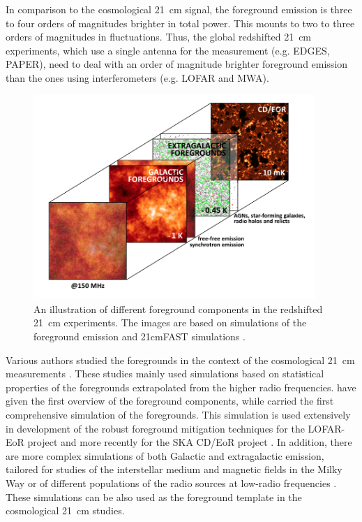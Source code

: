 In comparison to the cosmological 21~cm signal, the foreground emission is three to four orders of magnitudes brighter in total power. This mounts to two to three orders of magnitudes in fluctuations. Thus, the global redshifted 21~cm experiments, which use a single antenna for the measurement (e.g. EDGES, PAPER), need to deal with an order of magnitude brighter foreground emission than the ones using interferometers (e.g. LOFAR and MWA). 

\begin{figure}[!t]
   \centering
    \includegraphics[width=0.95\textwidth]{Chapman_Jelic/Images/fgcube.png}
    \caption{An illustration of different foreground components in the redshifted 21~cm experiments. The images are based on \cite{jelic08, jelic10} simulations of the foreground emission and 21cmFAST simulations \cite{mesinger11}.}
    \label{fig:fgcube}
\end{figure}

Various authors studied the foregrounds in the context of the cosmological 21~cm measurements \cite{shaver99, dimatteo02, dimatteo04, oh03, cooray04, jelic08, deoliveiracosta08, bowman09, jelic10}. These studies mainly used simulations based on statistical properties of the foregrounds extrapolated from the higher radio frequencies.  \cite{shaver99} have given the first overview of the foreground components, while \cite{jelic08} carried the first comprehensive simulation of the foregrounds. This simulation is used extensively in development of the robust foreground mitigation techniques for the LOFAR-EoR project \cite{jelic08,Harker2009MNRAS.393.1449H, Harker2009MNRAS.397.1138H, Harker2010MNRAS.405.2492H, Chapman2012MNRAS.423.2518C, Chapman2013MNRAS.429..165C} and more recently for the SKA CD/EoR project \cite{Chapman2015aska.confE...5C, Chapman2016MNRAS.458.2928C}.  In addition, there are  more complex simulations of both Galactic and extragalactic emission, tailored for studies of the interstellar medium and magnetic fields in the Milky Way \cite{waelkens09,sun09,haverkorn19} or of different populations of the radio sources at low-radio frequencies \cite{wilman08,wilman10,bonaldi19}. These simulations can be also used as the foreground template in the cosmological 21~cm studies.

